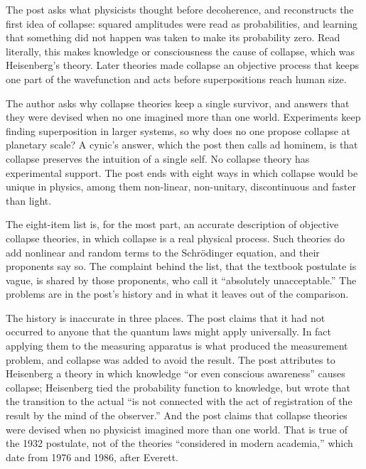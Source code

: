 \begin{afterword}
\summaryhead

The post asks what physicists thought before decoherence, and reconstructs the first idea of collapse: squared amplitudes were read as probabilities, and learning that something did not happen was taken to make its probability zero. Read literally, this makes knowledge or consciousness the cause of collapse, which was Heisenberg's theory. Later theories made collapse an objective process that keeps one part of the wavefunction and acts before superpositions reach human size.

The author asks why collapse theories keep a single survivor, and answers that they were devised when no one imagined more than one world. Experiments keep finding superposition in larger systems, so why does no one propose collapse at planetary scale? A cynic's answer, which the post then calls ad hominem, is that collapse preserves the intuition of a single self. No collapse theory has experimental support. The post ends with eight ways in which collapse would be unique in physics, among them non-linear, non-unitary, discontinuous and faster than light.

\responsehead

The eight-item list is, for the most part, an accurate description of objective collapse theories, in which collapse is a real physical process. Such theories do add nonlinear and random terms to the Schrödinger equation, and their proponents say so. The complaint behind the list, that the textbook postulate is vague, is shared by those proponents, who call it ``absolutely unacceptable.'' The problems are in the post's history and in what it leaves out of the comparison.

The history is inaccurate in three places. The post claims that it had not occurred to anyone that the quantum laws might apply universally. In fact applying them to the measuring apparatus is what produced the measurement problem, and collapse was added to avoid the result. The post attributes to Heisenberg a theory in which knowledge ``or even conscious awareness'' causes collapse; Heisenberg tied the probability function to knowledge, but wrote that the transition to the actual ``is not connected with the act of registration of the result by the mind of the observer.'' And the post claims that collapse theories were devised when no physicist imagined more than one world. That is true of the 1932 postulate, not of the theories ``considered in modern academia,'' which date from 1976 and 1986, after Everett.


\end{afterword}
